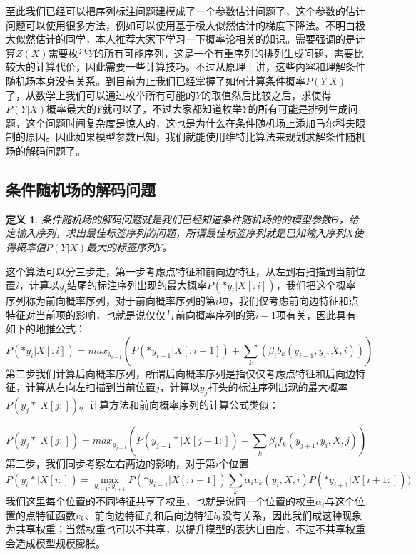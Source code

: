 \documentclass[twoside,a4paper,12pt]{book}%
\newtheorem{definition}{定义}
\begin{document}
至此我们已经可以把序列标注问题建模成了一个参数估计问题了，这个参数的估计问题可以使用很多方法，例如可以使用基于极大似然估计的梯度下降法。不明白极大似然估计的同学，本人推荐大家下学习一下概率论相关的知识。需要强调的是计算$Z(X)$需要枚举$Y$的所有可能序列，这是一个有重序列的排列生成问题，需要比较大的计算代价，因此需要一些计算技巧。不过从原理上讲，这些内容和理解条件随机场本身没有关系。到目前为止我们已经掌握了如何计算条件概率$P(Y|X)$了，从数学上我们可以通过枚举所有可能的$Y$的取值然后比较之后，求使得$P(Y|X)$概率最大的$Y$就可以了，不过大家都知道枚举$Y$的所有可能是排列生成问题，这个问题时间复杂度是惊人的，这也是为什么在条件随机场上添加马尔科夫限制的原因。因此如果模型参数已知，我们就能使用维特比算法来规划求解条件随机场的解码问题了。

\subsection{条件随机场的解码问题}
\begin{definition}
条件随机场的解码问题就是我们已经知道条件随机场的的模型参数$\Theta$，给定输入序列，求出最佳标签序列的问题，所谓最佳标签序列就是已知输入序列$X$使得概率值$P(Y|X)$最大的标签序列$Y$。
\end{definition}
这个算法可以分三步走，第一步考虑点特征和前向边特征，从左到右扫描到当前位置$i$，计算以$y_i$结尾的标注序列出现的最大概率$P(*y_i|X[:i])$，我们把这个概率序列称为前向概率序列，对于前向概率序列的第$i$项，我们仅考虑前向边特征和点特征对当前项的影响，也就是说仅仅与前向概率序列的第$i-1$项有关，因此具有如下的地推公式：
$$
P(*y_i|X[:i])=max_{y_{i-1}}{(P(*y_{i-1}|X[:i-1]) + \sum_{k}(\beta_i b_k(y_{i-1},y_i, X,i)))}
$$
第二步我们计算后向概率序列，所谓后向概率序列是指仅仅考虑点特征和后向边特征，计算从右向左扫描到当前位置$j$，计算以$y_j$打头的标注序列出现的最大概率$P(y_j*|X[j:])$。计算方法和前向概率序列的计算公式类似：

$$
P(y_j*|X[j:])=max_{y_{j+1}}{(P(y_{j+1}*|X[j+1:]) + \sum_{k}\beta_i f_k(y_{j+1},y_i, X,j))}
$$
第三步，我们同步考察左右两边的影响，对于第$i$个位置
$$
P(y_i*|X[i:])=\max_{y_{i-1};y_{i+1}}P(*y_{i-1}|X[:i-1])\sum_{k}\alpha_i v_k(y_i, X,i)P(*y_{i+1}|X[i+1:]))
$$
我们这里每个位置的不同特征共享了权重，也就是说同一个位置的权重$\alpha_i$与这个位置的点特征函数$v_k$、前向边特征$f_k$和后向边特征$b_k$没有关系，因此我们成这种现象为共享权重；当然权重也可以不共享，以提升模型的表达自由度，不过不共享权重会造成模型规模膨胀。
\end{document}
